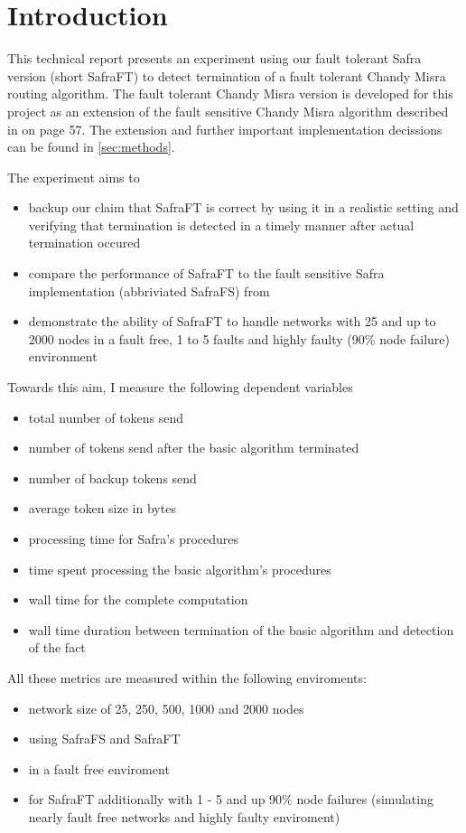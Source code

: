 \section{Introduction} 
This technical report presents an experiment using our fault tolerant Safra version (short SafraFT) \cite{ourpaper}
  to detect termination of a fault tolerant Chandy Misra routing algorithm.
 The fault tolerant Chandy Misra version is developed for this project as an extension of the fault sensitive Chandy Misra algorithm described in \cite{Fokkink:2018} on page 57.
 The extension and further important implementation decissions can be found in \cref{sec:methods}.
 
The experiment aims to
\begin{itemize}
	\item backup our claim that SafraFT is correct by using it in a realistic setting and verifying that termination is detected in a timely manner after actual termination occured
	\item compare the performance of SafraFT to the fault sensitive Safra implementation (abbriviated SafraFS) from \cite{demirbas2000optimal}
	\item demonstrate the ability of SafraFT to handle networks with 25 and up to 2000 nodes in a fault free, 1 to 5 faults and highly faulty (90\% node failure) environment
\end{itemize}

Towards this aim, I measure the following dependent variables
\begin{itemize}
	\item total number of tokens send
	\item number of tokens send after the basic algorithm terminated
	\item number of backup tokens send
	\item average token size in bytes
	\item processing time for Safra's procedures
	\item time spent processing the basic algorithm's procedures 
	\item wall time for the complete computation
	\item wall time duration between termination of the basic algorithm and detection of the fact
\end{itemize} 

All these metrics are measured within the following enviroments:
\begin{itemize}
	\item network size of 25, 250, 500, 1000 and 2000 nodes
	\item using SafraFS and SafraFT
	\item in a fault free enviroment
	\item for SafraFT additionally with 1 - 5 and up 90\% node failures (simulating nearly fault free networks and highly faulty enviroment)
\end{itemize}


